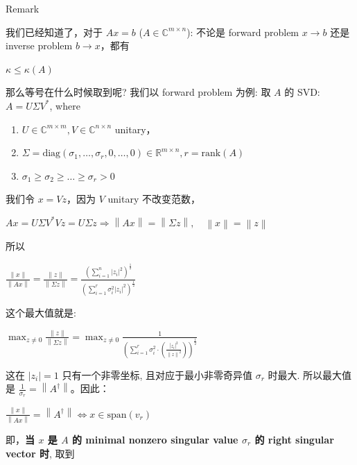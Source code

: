 \begin{qlremark}{Remark}

我们已经知道了，对于 \(Ax = b\) (\(A \in \mathbb{C}^{m \times n}\)): 不论是 forward problem \(x\rightarrow b\) 还是 inverse problem \(b\rightarrow x\)，都有

\(\kappa \leq \kappa(A)\)

那么等号在什么时候取到呢? 我们以 forward problem 为例: 取 \(A\) 的 SVD: \(A = U\Sigma V^{\ast}\), where

\begin{enumerate}
\tightlist
\item
  \(U \in \mathbb{C}^{m \times m},V \in \mathbb{C}^{n \times n}\) unitary，
\item
  \(\Sigma = \text{diag}\left( {\sigma_{1},\ldots,\sigma_{r},0,\ldots,0} \right) \in \mathbb{R}^{m \times n},r = \text{rank}(A)\)
\item
  \(\sigma_{1} \geq \sigma_{2} \geq \ldots \geq \sigma_{r} > 0\)
\end{enumerate}

我们令 \(x = Vz\)，因为 \(V\) unitary 不改变范数，

\(Ax = U\Sigma V^{\ast}Vz = U\Sigma z\Rightarrow\left\| {Ax} \right\| = \left\| {\Sigma z} \right\|,\quad\left\| x \right\| = \left\| z \right\|\)

所以

\(\frac{\left\| x \right\|}{\left\| {Ax} \right\|} = \frac{\left\| z \right\|}{\left\| {\Sigma z} \right\|} = \frac{\left( {\sum_{i = 1}^{n}\left| z_{i} \right|^{2}} \right)^{\frac{1}{2}}}{\left( {\sum_{i = 1}^{r}\sigma_{i}^{2}\left| z_{i} \right|^{2}} \right)^{\frac{1}{2}}}\)

这个最大值就是:

\(\max_{z \neq 0}\frac{\left\| z \right\|}{\left\| {\Sigma z} \right\|} = \max_{z \neq 0}\frac{1}{\left( {\sum_{i = 1}^{r}\sigma_{i}^{2} \cdot \left( \frac{\left| z_{i} \right|^{2}}{\left\| z \right\|^{2}} \right)} \right)^{\frac{1}{2}}}\)

这在 \(\left| z_{i} \right| = 1\) 只有一个非零坐标, 且对应于最小非零奇异值 \(\sigma_{r}\) 时最大. 所以最大值是 \(\frac{1}{\sigma_{r}} = \left\| A^{\dagger} \right\|\)。因此：

\(\frac{\left\| x \right\|}{\left\| {Ax} \right\|} = \left\| A^{\dagger} \right\|\Leftrightarrow x \in \text{span}\left( v_{r} \right)\)

即，\textbf{当 \(x\) 是 \(A\) 的 minimal nonzero singular value \(\sigma_{r}\) 的 right singular vector 时}, 取到


\end{qlremark}
